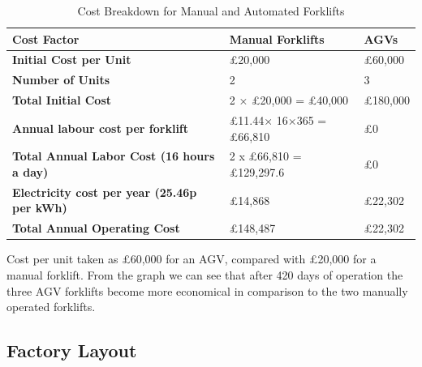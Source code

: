 \documentclass[12pt]{article}
\begin{document}
\begin{table}[htbp]
\centering
\begin{tabular}{|l|l|l|}
\hline
\textbf{Cost Factor}                   & \textbf{Manual Forklifts}           & \textbf{AGVs } \\ \hline
\textbf{Initial Cost per Unit}          & £20,000                             & £60,000                               \\ \hline
\textbf{Number of Units}                & 2                                    & 3                                     \\ \hline
\textbf{Total Initial Cost}             & 2 × £20,000 = £40,000               & £180,000                \\ \hline
\textbf{Annual labour cost per forklift }& £11.44× 16×365 = £66,810      & £0                                    \\ \hline
\textbf{Total Annual Labor Cost (16 hours a day)}        & 2 x £66,810 = £129,297.6    & £0                                    \\ \hline
 \textbf{Electricity cost per year (25.46p per kWh) } & £14,868&£22,302\\\hline  
 
\textbf{Total Annual Operating Cost}    & £148,487& £22,302\\ \hline
 
  
\end{tabular}

\caption{Cost Breakdown for Manual and Automated Forklifts}
\end{table}

\FloatBarrier
Cost per unit taken as £60,000 for an AGV, compared with £20,000 for a manual forklift. From the graph we can see that after 420 days of operation the three AGV forklifts become more economical in comparison to the two manually operated forklifts. 
\FloatBarrier
\subsection{Factory Layout}
\end{document}
